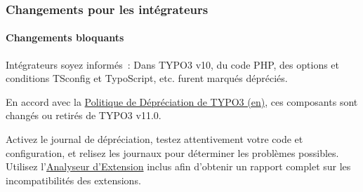 %

\begin{frame}[fragile]
	\frametitle{Changements pour les intégrateurs}
	\framesubtitle{Changements bloquants}

	\small
		Intégrateurs soyez informés~: Dans TYPO3 v10, du code PHP, des options et conditions
		TSconfig et TypoScript, etc. furent marqués dépréciés.

		\vspace{0.2cm}

		En accord avec la
		\href{https://typo3.org/article/typo3-deprecation-policy}{Politique de Dépréciation de TYPO3 (en)},
		ces composants sont changés ou retirés de TYPO3 v11.0.

		\vspace{0.2cm}

		Activez le journal de dépréciation, testez attentivement votre code et configuration, et
		relisez les journaux pour déterminer les problèmes possibles. Utilisez
		l'\href{https://docs.typo3.org/m/typo3/reference-coreapi/master/en-us/ApiOverview/ExtensionScanner/Index.html}{Analyseur d'Extension}
		inclus afin d'obtenir un rapport complet sur les incompatibilités des extensions.

	\normalsize

\end{frame}

